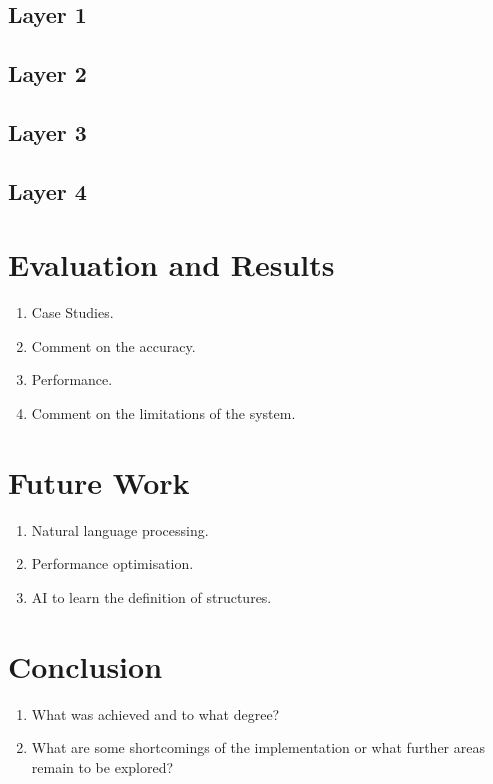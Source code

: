 \documentclass[11pt, a4paper]{article}
\begin{document}
\begin{flushleft}
\subsection*{Layer 1}

\subsection*{Layer 2}

\subsection*{Layer 3}

\subsection*{Layer 4}


\section*{Evaluation and Results}
\begin{enumerate}
    \item Case Studies.
    \item Comment on the accuracy.
    \item Performance.
    \item Comment on the limitations of the system.
\end{enumerate}

\section*{Future Work}
\begin{enumerate}
    \item Natural language processing.
    \item Performance optimisation.
    \item AI to learn the definition of structures.
\end{enumerate}

\section*{Conclusion}
\begin{enumerate}
    \item What was achieved and to what degree?
    \item What are some shortcomings of the implementation or what further areas remain to be explored?
\end{enumerate}
    
\end{flushleft}
\end{document}
